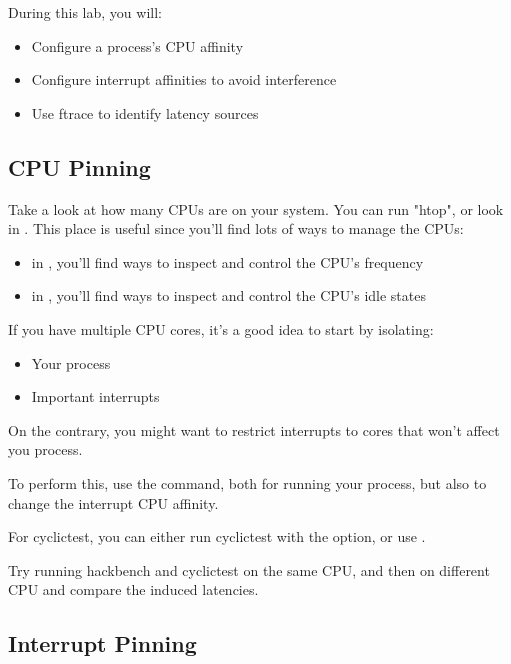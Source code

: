 
During this lab, you will:
\begin{itemize}
	\item Configure a process's CPU affinity
	\item Configure interrupt affinities to avoid interference
	\item Use ftrace to identify latency sources
\end{itemize}

\subsection{CPU Pinning}

Take a look at how many CPUs are on your system. You can run "htop", or
look in . This place is useful since you'll find
lots of ways to manage the CPUs:

\begin{itemize}
	\item in , you'll find ways to inspect and control the CPU's frequency
	\item in , you'll find ways to inspect and control the CPU's idle states
\end{itemize}

If you have multiple CPU cores, it's a good idea to start by isolating:
\begin{itemize}
	\item Your process
	\item Important interrupts
\end{itemize}

On the contrary, you might want to restrict interrupts to cores that won't affect
you process.

To perform this, use the  command, both for running your process, but
also to change the interrupt CPU affinity.

For cyclictest, you can either run cyclictest with the  option,
or use .

Try running hackbench and cyclictest on the same CPU, and then on different CPU and
compare the induced latencies.

\subsection{Interrupt Pinning}

